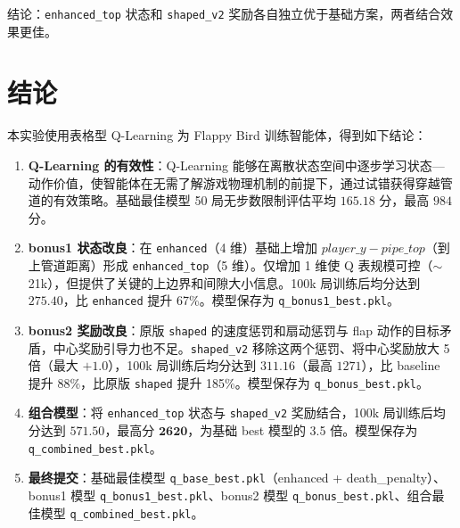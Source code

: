 \documentclass[12pt]{article}
\begin{document}
结论：\texttt{enhanced\_top} 状态和 \texttt{shaped\_v2} 奖励各自独立优于基础方案，两者结合效果更佳。

\section{结论}

本实验使用表格型 Q-Learning 为 Flappy Bird 训练智能体，得到如下结论：

\begin{enumerate}
	\item \textbf{Q-Learning 的有效性}：Q-Learning 能够在离散状态空间中逐步学习状态—动作价值，使智能体在无需了解游戏物理机制的前提下，通过试错获得穿越管道的有效策略。基础最佳模型 50 局无步数限制评估平均 $165.18$ 分，最高 $984$ 分。

	\item \textbf{bonus1 状态改良}：在 \texttt{enhanced}（4 维）基础上增加 $player\_y - pipe\_top$（到上管道距离）形成 \texttt{enhanced\_top}（5 维）。仅增加 1 维使 Q 表规模可控（$\sim$21k），但提供了关键的上边界和间隙大小信息。100k 局训练后均分达到 $\mathbf{275.40}$，比 \texttt{enhanced} 提升 67\%。模型保存为 \texttt{q\_bonus1\_best.pkl}。

	\item \textbf{bonus2 奖励改良}：原版 \texttt{shaped} 的速度惩罚和扇动惩罚与 flap 动作的目标矛盾，中心奖励引导力也不足。\texttt{shaped\_v2} 移除这两个惩罚、将中心奖励放大 5 倍（最大 $+1.0$），100k 局训练后均分达到 $\mathbf{311.16}$（最高 $1271$），比 baseline 提升 88\%，比原版 \texttt{shaped} 提升 185\%。模型保存为 \texttt{q\_bonus\_best.pkl}。

	\item \textbf{组合模型}：将 \texttt{enhanced\_top} 状态与 \texttt{shaped\_v2} 奖励结合，100k 局训练后均分达到 $\mathbf{571.50}$，最高分 $\mathbf{2620}$，为基础 best 模型的 3.5 倍。模型保存为 \texttt{q\_combined\_best.pkl}。

	\item \textbf{最终提交}：基础最佳模型 \texttt{q\_base\_best.pkl}（enhanced + death\_penalty）、bonus1 模型 \texttt{q\_bonus1\_best.pkl}、bonus2 模型 \texttt{q\_bonus\_best.pkl}、组合最佳模型 \texttt{q\_combined\_best.pkl}。
\end{enumerate}
\end{document}

